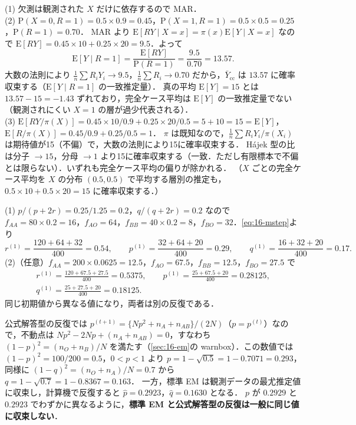\documentclass[a4paper,11pt,openany]{ltjsbook}
\newenvironment{kaitou}[1]{%
  \par\medskip\noindent
  \begin{tcolorbox}[enhanced,breakable,colback=bkgray!3,colframe=bkgray!60,boxrule=0.4pt,
    left=4pt,right=4pt,top=2pt,bottom=2pt,arc=1pt,
    title={\cref{#1}の解答},fonttitle=\bfseries\small,coltitle=white,colbacktitle=bkgray!80]}%
  {\end{tcolorbox}\par}
\newcommand{\E}{\mathrm{E}}
\newcommand{\Prob}{\mathrm{P}}
\begin{document}
\begin{kaitou}{reidai:16-2}
(1) 欠測は観測された $X$ だけに依存するので MAR．\\
(2) $\Prob(X=0,R=1)=0.5\times0.9=0.45$，$\Prob(X=1,R=1)=0.5\times0.5=0.25$，$\Prob(R=1)=0.70$．
MAR より $\E[RY\mid X=x]=\pi(x)\E[Y\mid X=x]$ なので $\E[RY]=0.45\times10+0.25\times20=9.5$．よって
\[
\E[Y\mid R=1]=\frac{\E[RY]}{\Prob(R=1)}=\frac{9.5}{0.70}=13.57 .
\]
大数の法則により $\frac1n\sum R_iY_i\to9.5$，$\frac1n\sum R_i\to0.70$ だから，$\bar Y_{\mathrm{cc}}$ は $13.57$ に確率収束する（$\E[Y\mid R=1]$ の一致推定量）．
真の平均 $\E[Y]=15$ とは $13.57-15=-1.43$ ずれており，完全ケース平均は $\E[Y]$ の一致推定量でない（観測されにくい $X=1$ の層が過少代表される）．\\
(3) $\E[RY/\pi(X)]=0.45\times10/0.9+0.25\times20/0.5=5+10=15=\E[Y]$，$\E[R/\pi(X)]=0.45/0.9+0.25/0.5=1$．
$\pi$ は既知なので，$\frac1n\sum R_iY_i/\pi(X_i)$ は期待値が15（不偏）で，大数の法則により15に確率収束する．
Hájek 型の比は分子 $\to15$，分母 $\to1$ より15に確率収束する（一致．ただし有限標本で不偏とは限らない）．いずれも完全ケース平均の偏りが除かれる．
（$X$ ごとの完全ケース平均を $X$ の分布 $(0.5,0.5)$ で平均する層別の推定も，$0.5\times10+0.5\times20=15$ に確率収束する．）
\end{kaitou}

\begin{kaitou}{reidai:16-3}
(1) $p/(p+2r)=0.25/1.25=0.2$，$q/(q+2r)=0.2$ なので
$f_{AA}=80\times0.2=16$，$f_{AO}=64$，$f_{BB}=40\times0.2=8$，$f_{BO}=32$．\cref{eq:16-mstep}より
\[
r^{(1)}=\frac{120+64+32}{400}=0.54,\qquad p^{(1)}=\frac{32+64+20}{400}=0.29,\qquad q^{(1)}=\frac{16+32+20}{400}=0.17 .
\]
(2)（任意）$f_{AA}=200\times0.0625=12.5$，$f_{AO}=67.5$，$f_{BB}=12.5$，$f_{BO}=27.5$ で
\begin{gather*}
r^{(1)}=\frac{120+67.5+27.5}{400}=0.5375,\qquad p^{(1)}=\frac{25+67.5+20}{400}=0.28125,\\
q^{(1)}=\frac{25+27.5+20}{400}=0.18125 .
\end{gather*}
同じ初期値から異なる値になり，両者は別の反復である．
\end{kaitou}
\begin{supbox}[補足：公式解答型の反復の極限]
公式解答型の反復では $p^{(t+1)}=\{Np^2+n_A+n_{AB}\}/(2N)$（$p=p^{(t)}$）なので，不動点は $Np^2-2Np+(n_A+n_{AB})=0$，すなわち
$(1-p)^2=(n_O+n_B)/N$ を満たす（\cref{sec:16-em}の warnbox）．この数値では $(1-p)^2=100/200=0.5$，$0<p<1$ より $p=1-\sqrt{0.5}=1-0.7071=0.293$，
同様に $(1-q)^2=(n_O+n_A)/N=0.7$ から $q=1-\sqrt{0.7}=1-0.8367=0.163$．
一方，標準 EM は観測データの最尤推定値に収束し，計算機で反復すると $\hat p=0.2923$，$\hat q=0.1630$ となる．
$p$ が $0.2929$ と $0.2923$ でわずかに異なるように，\textbf{標準 EM と公式解答型の反復は一般に同じ値に収束しない}．
\end{supbox}
\end{document}
